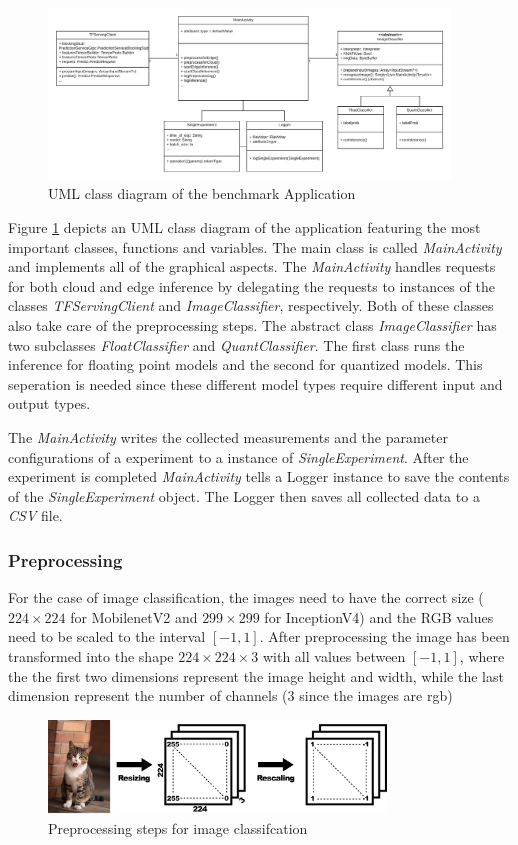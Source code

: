 \begin{figure}[htb]
\centering
\includegraphics[width=0.95\textwidth]{./Bilder/UML.png}
\caption{UML class diagram of the benchmark Application}
\label{fig:UML}
\end{figure}
Figure \ref{fig:UML} depicts an UML class diagram of the application featuring the most important classes, functions and variables. 
The main class is called \emph{MainActivity} and implements all of the graphical aspects. 
The \emph{MainActivity} handles requests for both cloud and edge inference by delegating the requests to instances of the classes \emph{TFServingClient} and \emph{ImageClassifier}, respectively. Both of these classes also take care of the preprocessing steps.
The abstract class \emph{ImageClassifier} has two subclasses \emph{FloatClassifier} and \emph{QuantClassifier}. The first class runs the inference for floating point models and the second for quantized models.
This seperation is needed since these different model types require different input and output types.

The \emph{MainActivity} writes the collected measurements and the parameter configurations of a experiment to a instance of \emph{SingleExperiment}. After the experiment is completed \emph{MainActivity} tells a Logger instance to save the contents of the \emph{SingleExperiment} object. The Logger then saves all collected data to a \emph{CSV} file.

\subsubsection{Preprocessing}
For the case of image classification, the images need to have the correct size ($224\times224$ for MobilenetV2 and $299\times299$ for InceptionV4) and the RGB values need to be scaled to the interval $[-1,1]$. After preprocessing the image has been transformed into the shape $224\times224\times3$ with all values between $[-1,1]$, where the the first two dimensions represent the image height and width, while the last dimension represent the number of channels (3 since the images are rgb)
\begin{figure}[H]
\centering
\includegraphics[width=0.8\textwidth]{./Bilder/preprocessing.png}
\caption{Preprocessing steps for image classifcation}
\label{fig:prepro}
\end{figure}
